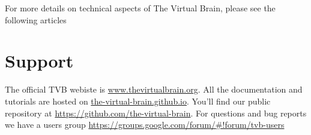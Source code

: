 \documentclass{tufte-handout}
\begin{document}
For more details on technical aspects of The Virtual Brain, please see the following articles
\citep{Sanz-Leon_2013, Woodman_2014}

\section{Support}\label{sec:support}

The official TVB webiste is \url{www.thevirtualbrain.org}.  
All the documentation and tutorials are hosted on \url{the-virtual-brain.github.io}.
You'll find our public  repository at \url{https://github.com/the-virtual-brain}. 
For questions and bug reports we have a users group \url{https://groups.google.com/forum/#!forum/tvb-users}



\end{document}
